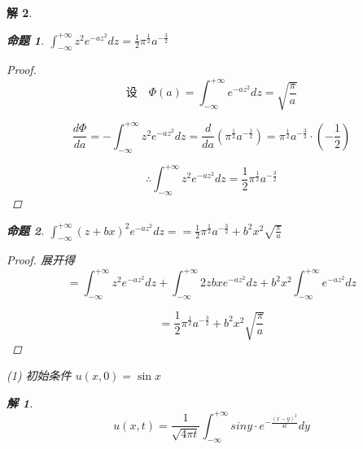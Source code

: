 \documentclass[12pt,a4paper]{article}
\newtheorem*{solution}{解}
\newtheorem{example}{命题}
\begin{document}
\begin{solution}
	
		\begin{example}\label{ex:4}
$\int_{-\infty}^{+\infty} z^2 e^{-a z^2} dz = \frac{1}{2} \pi^{\frac{1}{2}} a^{-\frac{3}{2}}$
	\end{example}
	
	\begin{proof}
		
	
	\begin{equation*}
		\text{设} \quad \Phi(a) = \int_{-\infty}^{+\infty} e^{-a z^2} dz = \sqrt{\frac{\pi}{a}}
	\end{equation*}
	
	\begin{equation*}
		\frac{d\Phi}{da} = -\int_{-\infty}^{+\infty} z^2 e^{-a z^2} dz = \frac{d}{da} \left( \pi^{\frac{1}{2}} a^{-\frac{1}{2}} \right) = \pi^{\frac{1}{2}} a^{-\frac{3}{2}} \cdot \left( -\frac{1}{2} \right)
	\end{equation*}
	
	\begin{equation*}
		\therefore \int_{-\infty}^{+\infty} z^2 e^{-a z^2} dz = \frac{1}{2} \pi^{\frac{1}{2}} a^{-\frac{3}{2}}
	\end{equation*}
		\end{proof}
		
		

		\begin{example}\label{ex:5}
$	\int_{-\infty}^{+\infty} (z + bx)^2 e^{-a z^2} dz=	= \frac{1}{2} \pi^{\frac{1}{2}} a^{-\frac{3}{2}} + b^2 x^2 \sqrt{\frac{\pi}{a}}$
\end{example}

\begin{proof}
	展开得
	\begin{equation*}
		= \int_{-\infty}^{+\infty} z^2 e^{-a z^2} dz + \int_{-\infty}^{+\infty} 2 z b x e^{-a z^2} dz + b^2 x^2 \int_{-\infty}^{+\infty} e^{-a z^2} dz
	\end{equation*}
	
	\begin{equation*}
		= \frac{1}{2} \pi^{\frac{1}{2}} a^{-\frac{3}{2}} + b^2 x^2 \sqrt{\frac{\pi}{a}}
	\end{equation*}
	
		\end{proof}
	
	
	\newpage
(1) 初始条件 \( u(x,0) = \sin x \)
	
	\begin{solution}
		\begin{equation*}
			u(x,t)=\frac{1}{\sqrt{4\pi t}}\int_{-\infty}^{+\infty}siny\cdot e^{-\frac{(x-y)^2}{4t}}dy
		\end{equation*}
		

\end{solution}
\end{solution}
\end{document}
